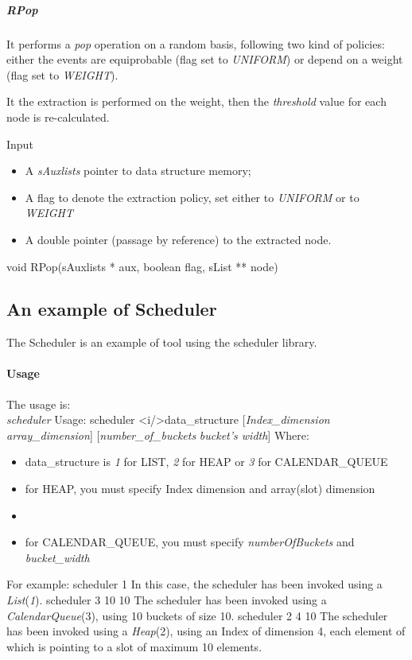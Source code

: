 \subparagraph{RPop}

It performs a \textit{pop} operation on a random basis, following two kind of policies: either the events are equiprobable (flag set to \textit{UNIFORM}) or depend on a weight (flag set to \textit{WEIGHT}).

It the extraction is performed on the weight, then the \textit{threshold} value for each node is re-calculated.

Input
\begin{itemize}
\item A \textit{sAuxlists} pointer to data structure memory;
\item A flag to denote the extraction policy, set either to  \textit{UNIFORM} or to \textit{WEIGHT}
\item A double pointer (passage by reference) to the extracted node.
\end{itemize}

void RPop(sAuxlists * aux, boolean flag, sList ** node)


\subsection{An example of Scheduler}
The Scheduler is an example of tool using the scheduler library. 

\paragraph{Usage}
The usage is:\\
\textit{scheduler} Usage: scheduler {<i/>data\_structure} [\textit{Index\_dimension} \textit{array\_dimension}] [\textit{number\_of\_buckets} \textit{bucket's width}]
Where:
\begin{itemize}
\item data\_structure is \textit{1} for LIST, \textit{2} for HEAP or \textit{3} for CALENDAR\_QUEUE
\item for HEAP, you must specify Index dimension and array(slot) dimension \item
\item for CALENDAR\_QUEUE, you must specify \textit{numberOfBuckets} and \textit{bucket\_width}
\end{itemize}

For example:
scheduler 1 
In this case, the scheduler has been invoked using a \textit{List}(\textit{1}).
scheduler 3 10 10
The scheduler has been invoked using a \textit{CalendarQueue}(3), using 10 buckets of size 10.
scheduler 2 4 10
The scheduler has been invoked using a \textit{Heap}(2), using an Index of dimension 4, each element of which is pointing to a slot of maximum 10 elements.

